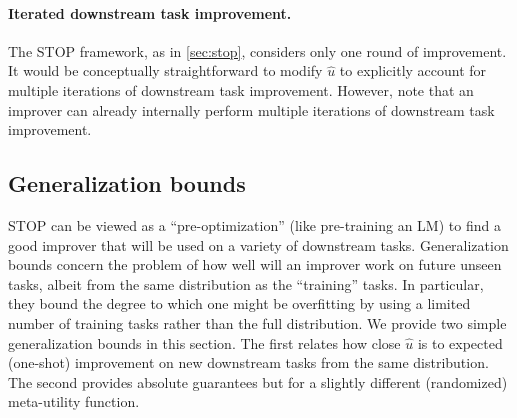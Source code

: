 \documentclass{article} %
\newcommand{\metautil}{{\hat{u}}}
\begin{document}
\paragraph{Iterated downstream task improvement.}
The STOP framework, as in \cref{sec:stop}, considers only one round of improvement. 
%
It would be conceptually straightforward to modify $\metautil$ to explicitly account for multiple iterations of downstream task improvement. However, note that an improver can already internally perform multiple iterations of downstream task improvement. 

\subsection{Generalization bounds}
STOP can be viewed as a ``pre-optimization'' (like pre-training an LM) to find a good improver that will be used on a variety of downstream tasks.
Generalization bounds concern the problem of how well will an improver work on future unseen tasks, albeit from the same distribution as the ``training'' tasks. In particular, they bound the degree to which one might be overfitting by using a limited number of training tasks rather than the full distribution. We provide two simple generalization bounds in this section. The first relates how close $\metautil$ is to expected (one-shot) improvement on new downstream tasks from the same distribution. The second provides absolute guarantees but for a slightly different (randomized) meta-utility function.
\end{document}
